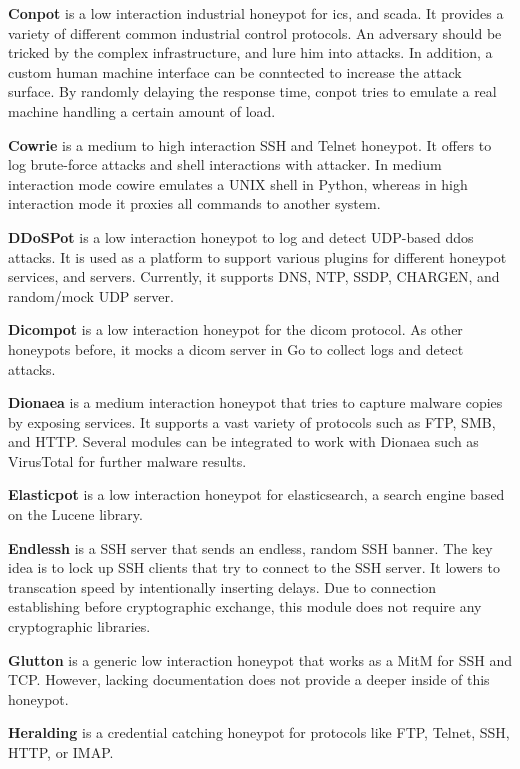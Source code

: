 \textbf{Conpot} \cite{conpot2021} is a low interaction industrial honeypot for \ac{ics}, and \ac{scada}.
It provides a variety of different common industrial control protocols.
An adversary should be tricked by the complex infrastructure, and lure him into attacks.
In addition, a custom human machine interface can be conntected to increase the attack surface.
By randomly delaying the response time, conpot tries to emulate a real machine handling a certain amount of load.

\textbf{Cowrie} \cite{cowire2021} is a medium to high interaction SSH and Telnet honeypot.
It offers to log brute-force attacks and shell interactions with attacker.
In medium interaction mode cowire emulates a UNIX shell in Python, whereas in high interaction mode it proxies all commands to another system.

\textbf{DDoSPot} \cite{ddosspot2021} is a low interaction honeypot to log and detect UDP-based \ac{ddos} attacks.
It is used as a platform to support various plugins for different honeypot services, and servers.
Currently, it supports DNS, NTP, SSDP, CHARGEN, and random/mock UDP server.

\textbf{Dicompot} \cite{dicompot2021} is a low interaction honeypot for the \ac{dicom} protocol.
As other honeypots before, it mocks a \ac{dicom} server in Go to collect logs and detect attacks.

\textbf{Dionaea} \cite{dionaea2021} is a medium interaction honeypot that tries to capture malware copies by exposing services.
It supports a vast variety of protocols such as FTP, SMB, and HTTP.
Several modules can be integrated to work with Dionaea such as VirusTotal for further malware results.

\textbf{Elasticpot} \cite{elasticpot2021} is a low interaction honeypot for elasticsearch, a search engine based on the Lucene library.

\textbf{Endlessh} \cite{endlessh2021} is a SSH server that sends an endless, random SSH banner.
The key idea is to lock up SSH clients that try to connect to the SSH server.
It lowers to transcation speed by intentionally inserting delays.
Due to connection establishing before cryptographic exchange, this module does not require any cryptographic libraries.

\textbf{Glutton} \cite{glutton2021} is a generic low interaction honeypot that works as a MitM for SSH and TCP.
However, lacking documentation does not provide a deeper inside of this honeypot.

\textbf{Heralding} \cite{heralding2021} is a credential catching honeypot for protocols like FTP, Telnet, SSH, HTTP, or IMAP.

